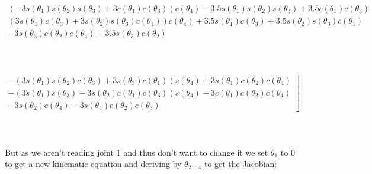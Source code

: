 \documentclass[12pt]{article}
\begin{document}
$\begin{matrix}\left(- 3 s{\left(\theta_{1} \right)} s{\left(\theta_{2} \right)} s{\left(\theta_{3} \right)} + 3 c{\left(\theta_{1} \right)} c{\left(\theta_{3} 
\right)}\right) c{\left(\theta_{4} \right)} - 3.5 s{\left(\theta_{1} \right)} s{\left(\theta_{2} \right)} s{\left(\theta_{3} \right)} + 3.5 c{\left(\theta_{1} \right)} c{\left(\theta_{3} \right)}\\\left(3 s{\left(\theta_{1} \right)} c{\left(\theta_{3} \right)} + 3 s{\left(\theta_{2} \right)} s{\left(\theta_{3} \right)} c{\left(\theta_{1} \right)}\right) c{\left(\theta_{4} \right)} + 3.5 s{\left(\theta_{1} \right)} c{\left(\theta_{3} \right)} + 3.5 s{\left(\theta_{2} \right)} s{\left(\theta_{3} \right)} c{\left(\theta_{1} \right)}\\- 3 s{\left(\theta_{3} \right)} c{\left(\theta_{2} \right)} c{\left(\theta_{4} \right)} - 3.5 s{\left(\theta_{3} \right)} c{\left(\theta_{2} \right)}\end{matrix}$\\\\\\\\
$\left.\begin{matrix}- \left(3 s{\left(\theta_{1} \right)} s{\left(\theta_{2} \right)} c{\left(\theta_{3} \right)} + 3 s{\left(\theta_{3} \right)} c{\left(\theta_{1} 
\right)}\right) s{\left(\theta_{4} \right)} + 3 s{\left(\theta_{1} \right)} c{\left(\theta_{2} \right)} c{\left(\theta_{4} \right)}\\- \left(3 s{\left(\theta_{1} \right)} s{\left(\theta_{3} \right)} - 3 s{\left(\theta_{2} \right)} c{\left(\theta_{1} \right)} c{\left(\theta_{3} \right)}\right) s{\left(\theta_{4} \right)} - 3 c{\left(\theta_{1} \right)} c{\left(\theta_{2} \right)} c{\left(\theta_{4} \right)}\\- 3 s{\left(\theta_{2} \right)} c{\left(\theta_{4} \right)} - 3 s{\left(\theta_{4} \right)} c{\left(\theta_{2} \right)} c{\left(\theta_{3} \right)}\end{matrix}\right]$\\\\\\\\
But as we aren't reading joint 1 and thus don't want to change it we set $\theta_{1}$ to 0 to get a new kinematic equation and deriving by $\theta_{2 - 4}$ to get the Jacobian:\\\\\\\\
\end{document}
